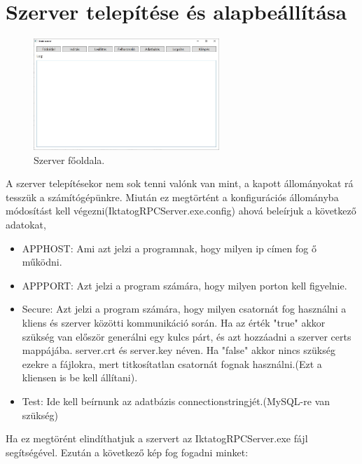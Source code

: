 \documentclass[
]{thesis-ekf}
\theoremstyle{definition}
\theoremstyle{remark}
\begin{document}
\section{Szerver telepítése és alapbeállítása}
\begin{figure}[!h]
	\centering
	\includegraphics[width=7cm]{dokukepek/sfooldal}
	\caption{Szerver főoldala.}
	\label{fig:sfooldal}
\end{figure}

A szerver telepítésekor nem sok tenni valónk van mint, a kapott állományokat rá tesszük a számítógépünkre. Miután ez megtörtént a konfigurációs állományba módosítást kell végezni(IktatogRPCServer.exe.config) ahová beleírjuk a következő adatokat, 
\begin{itemize}
	\item[] APPHOST: Ami azt jelzi a programnak, hogy milyen ip címen fog ő működni.
	\item[] APPPORT: Azt jelzi a program számára, hogy milyen porton kell figyelnie.
	\item[] Secure: Azt jelzi a program számára, hogy milyen csatornát fog használni a kliens és szerver közötti kommunikáció során. Ha az érték "true" akkor szükség van először generálni egy kulcs párt, és azt hozzáadni a szerver certs mappájába. server.crt és server.key néven. Ha "false" akkor nincs szükség ezekre a fájlokra, mert titkosítatlan csatornát fognak használni.(Ezt a kliensen is be kell állítani).
	\item[] Test: Ide kell beírnunk az adatbázis connectionstringjét.(MySQL-re van szükség)
\end{itemize}

Ha ez megtörént elindíthatjuk a szervert az IktatogRPCServer.exe fájl segítségével. Ezután a következő kép fog fogadni minket:
\end{document}
